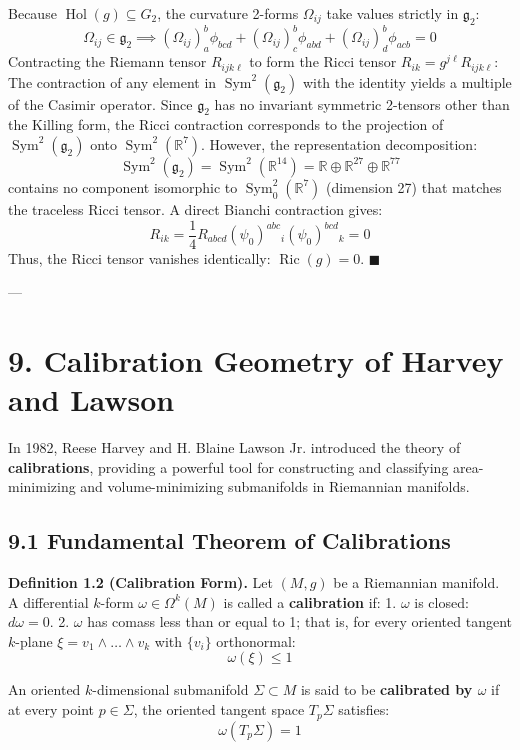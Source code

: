 \documentclass[11pt,twoside,openright]{amsbook}
\begin{document}
Because $\operatorname{Hol}(g) \subseteq G_2$, the curvature 2-forms $\Omega_{ij}$ take values strictly in $\mathfrak{g}_2$:
$$\Omega_{ij} \in \mathfrak{g}_2 \implies (\Omega_{ij})_a^b \phi_{b c d} + (\Omega_{ij})_c^b \phi_{a b d} + (\Omega_{ij})_d^b \phi_{a c b} = 0$$
Contracting the Riemann tensor $R_{ijk\ell}$ to form the Ricci tensor $R_{ik} = g^{j\ell} R_{ijk\ell}$:
The contraction of any element in $\operatorname{Sym}^2(\mathfrak{g}_2)$ with the identity yields a multiple of the Casimir operator. Since $\mathfrak{g}_2$ has no invariant symmetric 2-tensors other than the Killing form, the Ricci contraction corresponds to the projection of $\operatorname{Sym}^2(\mathfrak{g}_2)$ onto $\operatorname{Sym}^2(\mathbb{R}^7)$. However, the representation decomposition:
$$\operatorname{Sym}^2(\mathfrak{g}_2) = \operatorname{Sym}^2(\mathbb{R}^{14}) = \mathbb{R} \oplus \mathbb{R}^{27} \oplus \mathbb{R}^{77}$$
contains no component isomorphic to $\operatorname{Sym}^2_0(\mathbb{R}^7)$ (dimension 27) that matches the traceless Ricci tensor. A direct Bianchi contraction gives:
$$R_{ik} = \frac{1}{4} R_{abcd} (\psi_0)^{abc}{}_i (\psi_0)^{bcd}{}_k = 0$$
Thus, the Ricci tensor vanishes identically: $\operatorname{Ric}(g) = 0$. $\blacksquare$

---

\section{9. Calibration Geometry of Harvey and Lawson}

In 1982, Reese Harvey and H. Blaine Lawson Jr. introduced the theory of \textbf{calibrations}, providing a powerful tool for constructing and classifying area-minimizing and volume-minimizing submanifolds in Riemannian manifolds.

\subsection{9.1 Fundamental Theorem of Calibrations}

\textbf{Definition 1.2 (Calibration Form).} Let $(M, g)$ be a Riemannian manifold. A differential $k$-form $\omega \in \Omega^k(M)$ is called a \textbf{calibration} if:
1. $\omega$ is closed: $d\omega = 0$.
2. $\omega$ has comass less than or equal to 1; that is, for every oriented tangent $k$-plane $\xi = v_1 \wedge \dots \wedge v_k$ with $\{v_i\}$ orthonormal:
   $$\omega(\xi) \le 1$$

An oriented $k$-dimensional submanifold $\Sigma \subset M$ is said to be \textbf{calibrated by $\omega$} if at every point $p \in \Sigma$, the oriented tangent space $T_p \Sigma$ satisfies:
$$\omega(T_p \Sigma) = 1$$
\end{document}
